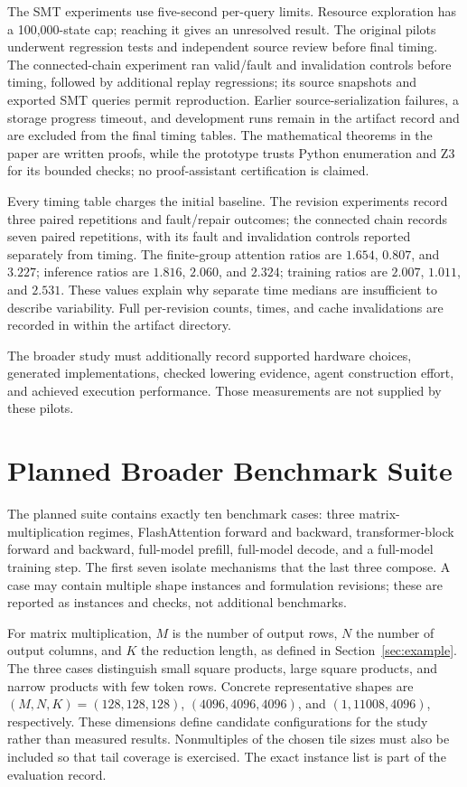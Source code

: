 \documentclass[11pt]{article}
\begin{document}
The SMT experiments use five-second per-query limits. Resource exploration has a 100,000-state cap; reaching it gives an unresolved result. The original pilots underwent regression tests and independent source review before final timing. The connected-chain experiment ran valid/fault and invalidation controls before timing, followed by additional replay regressions; its source snapshots and exported SMT queries permit reproduction. Earlier source-serialization failures, a storage progress timeout, and development runs remain in the artifact record and are excluded from the final timing tables. The mathematical theorems in the paper are written proofs, while the prototype trusts Python enumeration and Z3 for its bounded checks; no proof-assistant certification is claimed.

Every timing table charges the initial baseline. The revision experiments record three paired repetitions and fault/repair outcomes; the connected chain records seven paired repetitions, with its fault and invalidation controls reported separately from timing. The finite-group attention ratios are $1.654$, $0.807$, and $3.227$; inference ratios are $1.816$, $2.060$, and $2.324$; training ratios are $2.007$, $1.011$, and $2.531$. These values explain why separate time medians are insufficient to describe variability. Full per-revision counts, times, and cache invalidations are recorded in  within the artifact directory.

The broader study must additionally record supported hardware choices, generated implementations, checked lowering evidence, agent construction effort, and achieved execution performance. Those measurements are not supplied by these pilots.

\section{Planned Broader Benchmark Suite}\label{app:planned-suite}
The planned suite contains exactly ten benchmark cases: three matrix-multiplication regimes, FlashAttention forward and backward, transformer-block forward and backward, full-model prefill, full-model decode, and a full-model training step. The first seven isolate mechanisms that the last three compose. A case may contain multiple shape instances and formulation revisions; these are reported as instances and checks, not additional benchmarks.

For matrix multiplication, $M$ is the number of output rows, $N$ the number of output columns, and $K$ the reduction length, as defined in Section~\ref{sec:example}. The three cases distinguish small square products, large square products, and narrow products with few token rows. Concrete representative shapes are $(M,N,K)=(128,128,128)$, $(4096,4096,4096)$, and $(1,11008,4096)$, respectively. These dimensions define candidate configurations for the study rather than measured results. Nonmultiples of the chosen tile sizes must also be included so that tail coverage is exercised. The exact instance list is part of the evaluation record.
\end{document}

